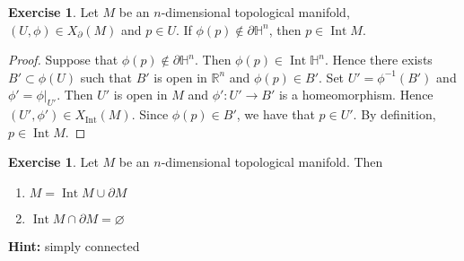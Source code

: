 \documentclass{book}
\theoremstyle{definition}
\newtheorem{ex}[definition]{Exercise}
\renewcommand{\H}{\mathbb{H}}
\newcommand{\R}{\mathbb{R}}
\DeclareMathOperator{\Int}{Int}
\DeclareMathOperator*{\0}{\mbf{0}}
\DeclareMathOperator*{\1}{\mbf{1}}
\newcommand{\tbf}[1]{\textbf{#1}}
\newcommand{\p}{\partial}
\begin{document}
	\begin{ex}
		Let $M$ be an $n$-dimensional topological manifold, $(U, \phi) \in X_{\p}(M)$ and $p \in U$. If $\phi(p) \not \in \p \H^n$, then $p \in \Int M$.
	\end{ex}

	\begin{proof}
		Suppose that $\phi(p) \not \in \p \H^n$.  Then  $\phi(p) \in \Int \H^n$. Hence there exists $B' \subset \phi(U)$ such that $B'$ is open in $\R^n$ and $\phi(p) \in B'$. Set $U' = \phi^{-1}(B')$ and $\phi' = \phi|_{U'}$. Then $U'$ is open in $M$ and $\phi': U' \rightarrow B'$ is a homeomorphism. Hence $(U', \phi') \in X_{\Int}(M)$. Since $\phi(p) \in B'$, we have that $p \in U'$. By definition, $p \in \Int M$.
	\end{proof}

	\begin{ex}
		Let $M$ be an $n$-dimensional topological manifold. Then 
		\begin{enumerate}
			\item $M = \Int M \cup \p M $
			\item $\Int M \cap \p M = \varnothing$
		\end{enumerate}
		\tbf{Hint:} simply connected
	\end{ex}
\end{document}
